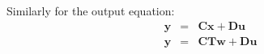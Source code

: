 Similarly for the output equation:
\begin{eqnarray*}
	\mathbf{y} & = & \mathbf{Cx} + \mathbf{Du} \\
	\mathbf{y} & = & \mathbf{CTw} + \mathbf{Du} \\	
\end{eqnarray*}

\endinput


